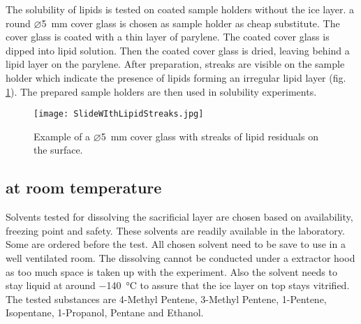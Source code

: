 

The solubility of lipids is tested on coated sample holders without the ice layer. a round $\varnothing$\SI{5}{\milli\meter} cover glass is chosen as sample holder as cheap substitute. The cover glass is coated with a thin layer of parylene. The coated cover glass is dipped into lipid solution. Then the coated cover glass is dried, leaving behind a lipid layer on the parylene. After preparation, streaks are visible on the sample holder which indicate the presence of lipids forming an irregular lipid layer (fig. \ref{fig:streaksOnSampleHolder}). The prepared sample holders are then used in solubility experiments.

\begin{figure}[hbt!]
	\centering
	\texttt{[image: SlideWIthLipidStreaks.jpg]}
	\caption{Example of a $\varnothing$\SI{5}{\milli\meter} cover glass with streaks of lipid residuals on the surface.}
	\label{fig:streaksOnSampleHolder}
\end{figure}

\subsection{at room temperature}

Solvents tested for dissolving the sacrificial layer are chosen based on availability, freezing point and safety. These solvents are readily available in the laboratory. Some are ordered before the test. All chosen solvent need to be save to use in a well ventilated room. The dissolving cannot be conducted under a extractor hood as too much space is taken up with the experiment. Also the solvent needs to stay liquid at around \SI{-140}{\degreeCelsius} to assure that the ice layer on top stays vitrified. The tested substances are 4-Methyl Pentene, 3-Methyl Pentene, 1-Pentene, Isopentane, 1-Propanol, Pentane and Ethanol. 

